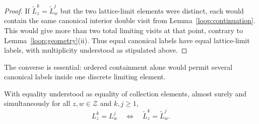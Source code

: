 \begin{proof}
If $\widetilde L_z^k=\widetilde L_w^j$ but the two lattice-limit
elements were distinct, each would contain the same canonical
interior double visit from Lemma~\ref{loop:continuation}.  This would
give more than two total limiting visits at that point, contrary to
Lemma~\ref{loop:geometry}(ii).  Thus equal canonical labels have equal
lattice-limit labels, with multiplicity understood as stipulated above.
\end{proof}

The converse is essential: ordered containment alone would permit
several canonical labels inside one discrete limiting element.

\begin{lemma}
\label{loop:label-equivalence}
With equality understood as equality of collection elements, almost surely
and simultaneously for all $z,w\in\mathcal Z$ and
$k,j\ge1$,
\begin{equation}\label{loop:label-iff}
 L_z^k=L_w^j
 \quad\Longleftrightarrow\quad
 \widetilde L_z^k=\widetilde L_w^j.
\end{equation}
\end{lemma}

